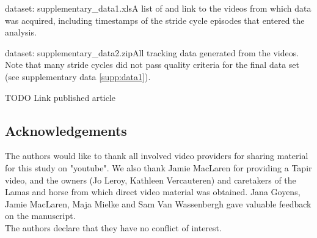 dataset: {supplementary\_data1.xls}{A list of and link to the videos from which data was acquired, including timestamps of the stride cycle episodes that entered the analysis. }\label{supp:data1}

dataset: {supplementary\_data2.zip}{All tracking data generated from the videos. Note that many stride cycles did not pass quality criteria for the final data set (see supplementary data \ref{supp:data1}). }\label{supp:data2}



TODO Link published article



\FloatBarrier\pagebreak

\subsection{Acknowledgements}
The authors would like to thank all involved video providers for sharing material for this study on "youtube". 
We also thank Jamie MacLaren for providing a Tapir video, and the owners (Jo Leroy, Kathleen Vercauteren) and caretakers of the Lamas and horse from which direct video material was obtained. 
Jana Goyens, Jamie MacLaren, Maja Mielke and Sam Van Wassenbergh gave valuable feedback on the manuscript.
\bigskip\\
The authors declare that they have no conflict of interest.



% 
% 
